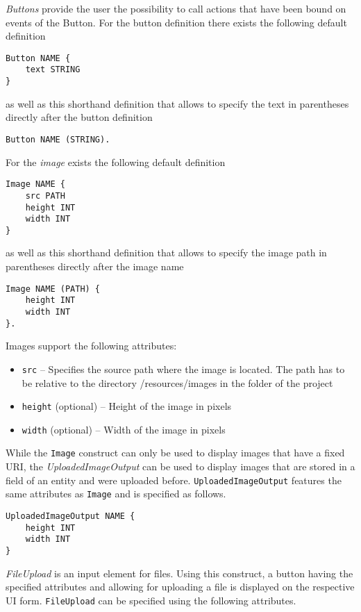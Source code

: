 \textit{Buttons} provide the user the possibility to call actions that have been bound on events of the Button. For the button definition there exists the following default definition
\begin{lstlisting}
Button NAME {
	text STRING
}
\end{lstlisting}
as well as this shorthand definition that allows to specify the text in parentheses directly after the button definition
\begin{lstlisting}
Button NAME (STRING).
\end{lstlisting}


For the \textit{image} exists the following default definition
\begin{lstlisting}
Image NAME {
	src PATH
	height INT
	width INT
}
\end{lstlisting}
as well as this shorthand definition that allows to specify the image path in parentheses directly after the image name
\begin{lstlisting}
Image NAME (PATH) {
	height INT
	width INT
}.
\end{lstlisting}
Images support the following attributes:
\begin{itemize}
\item \lstinline!src! -- Specifies the source path where the image is located. The path has to be relative to the directory /resources/images in the folder of the \MD project
\item \lstinline!height! (optional) -- Height of the image in pixels
\item \lstinline!width! (optional) -- Width of the image in pixels
\end{itemize}


While the \lstinline!Image! construct can only be used to display images that have a fixed URI, the \textit{UploadedImageOutput} can be used to display images that are stored in a field of an entity and were uploaded before. \lstinline!UploadedImageOutput! features the same attributes as \lstinline!Image! and is specified as follows.

\begin{lstlisting}
UploadedImageOutput NAME {
	height INT
	width INT
}
\end{lstlisting}

\textit{FileUpload} is an input element for files. Using this construct, a button having the specified attributes and allowing for uploading a file is displayed on the respective UI form. \lstinline!FileUpload! can be specified using the following attributes.

